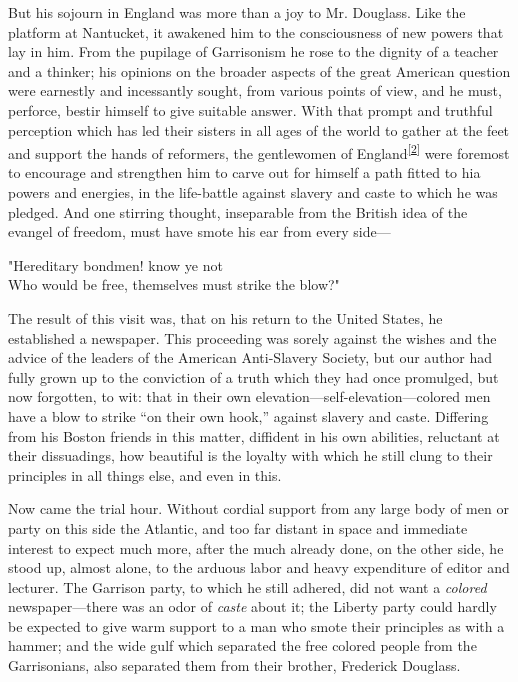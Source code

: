 But his sojourn in England was more than a joy to Mr. Douglass. Like the
platform at Nantucket, it awakened him to the consciousness of new
powers that lay in him. From the pupilage of Garrisonism he rose to the
dignity of a teacher and a thinker; his opinions on the broader aspects
of the great American question were earnestly and incessantly sought,
from various points of view, and he must, perforce, bestir himself to
give suitable answer. With that prompt and truthful perception which has
led their sisters in all ages of the world to gather at the feet and
support the hands of reformers, the gentlewomen of
England\textsuperscript{\protect\hyperlink{cite_note-2}{{[}2{]}}} were
foremost to encourage and strengthen him to carve out for himself a path
fitted to hia powers and energies, in the life-battle against slavery
and caste to which he was pledged. And one stirring thought, inseparable
from the British idea of the evangel of freedom, must have smote his ear
from every side---

{"}Hereditary bondmen! know ye not\\
Who would be free, themselves must strike the blow?"

The result of this visit was, that on his return to the United States,
he established a newspaper. This proceeding was sorely against the
wishes and the advice of the leaders of the American Anti-Slavery
Society, but our author had fully grown up to the conviction of a truth
which they had once promulged, but now forgotten, to wit: that in their
own elevation---self-elevation---colored men have a blow to strike ``on
their own hook,'' against slavery and caste. Differing from his Boston
friends in this matter, {}diffident in his own abilities, reluctant at
their dissuadings, how beautiful is the loyalty with which he still
clung to their principles in all things else, and even in this.

Now came the trial hour. Without cordial support from any large body of
men or party on this side the Atlantic, and too far distant in space and
immediate interest to expect much more, after the much already done, on
the other side, he stood up, almost alone, to the arduous labor and
heavy expenditure of editor and lecturer. The Garrison party, to which
he still adhered, did not want a \emph{colored} newspaper---there was an
odor of \emph{caste} about it; the Liberty party could hardly be
expected to give warm support to a man who smote their principles as
with a hammer; and the wide gulf which separated the free colored people
from the Garrisonians, also separated them from their brother, Frederick
Douglass.

